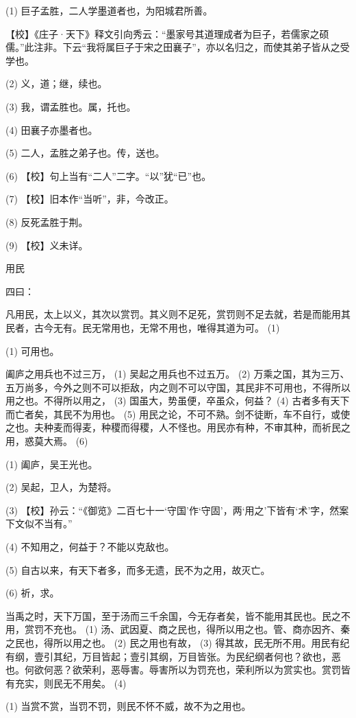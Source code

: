 \documentclass[12pt,UTF8]{ctexbook}
\begin{document}
(1) 巨子孟胜，二人学墨道者也，为阳城君所善。

【校】《庄子·天下》释文引向秀云：“墨家号其道理成者为巨子，若儒家之硕儒。”此注非。下云“我将属巨子于宋之田襄子”，亦以名归之，而使其弟子皆从之受学也。

(2) 义，道；继，续也。

(3) 我，谓孟胜也。属，托也。

(4) 田襄子亦墨者也。

(5) 二人，孟胜之弟子也。传，送也。

(6) 【校】句上当有“二人”二字。“以”犹“已”也。

(7) 【校】旧本作“当听”，非，今改正。

(8) 反死孟胜于荆。

(9) 【校】义未详。





用民


四曰：

凡用民，太上以义，其次以赏罚。其义则不足死，赏罚则不足去就，若是而能用其民者，古今无有。民无常用也，无常不用也，唯得其道为可。 (1)

(1) 可用也。

阖庐之用兵也不过三万， (1) 吴起之用兵也不过五万。 (2) 万乘之国，其为三万、五万尚多，今外之则不可以拒敌，内之则不可以守国，其民非不可用也，不得所以用之也。不得所以用之， (3) 国虽大，势虽便，卒虽众，何益？ (4) 古者多有天下而亡者矣，其民不为用也。 (5) 用民之论，不可不熟。剑不徒断，车不自行，或使之也。夫种麦而得麦，种稷而得稷，人不怪也。用民亦有种，不审其种，而祈民之用，惑莫大焉。 (6)

(1) 阖庐，吴王光也。

(2) 吴起，卫人，为楚将。

(3) 【校】孙云：“《御览》二百七十一‘守国’作‘守固’，两‘用之’下皆有‘术’字，然案下文似不当有。”

(4) 不知用之，何益于？不能以克敌也。

(5) 自古以来，有天下者多，而多无遗，民不为之用，故灭亡。

(6) 祈，求。

当禹之时，天下万国，至于汤而三千余国，今无存者矣，皆不能用其民也。民之不用，赏罚不充也。 (1) 汤、武因夏、商之民也，得所以用之也。管、商亦因齐、秦之民也，得所以用之也。 (2) 民之用也有故， (3) 得其故，民无所不用。用民有纪有纲，壹引其纪，万目皆起；壹引其纲，万目皆张。为民纪纲者何也？欲也，恶也。何欲何恶？欲荣利，恶辱害。辱害所以为罚充也，荣利所以为赏实也。赏罚皆有充实，则民无不用矣。 (4)

(1) 当赏不赏，当罚不罚，则民不怀不威，故不为之用也。
\end{document}

